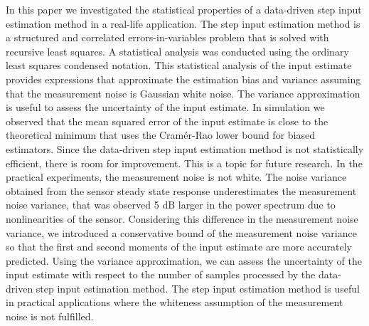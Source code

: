 In this paper we investigated the statistical properties of a data-driven step input estimation method in a real-life application.
The step input estimation method is a structured and correlated errors-in-variables problem that is solved with recursive least squares.
A statistical analysis was conducted using the ordinary least squares condensed notation. 
This statistical analysis of the input estimate provides expressions that approximate the estimation bias and variance assuming that the measurement noise is Gaussian white noise. 
The variance approximation is useful to assess the uncertainty of the input estimate.
In simulation we observed that the mean squared error of the input estimate is close to the theoretical minimum that uses the Cram\'er-Rao lower bound for biased estimators.
Since the data-driven step input estimation method is not statistically efficient, there is room for improvement. This is a topic for future research.
In the practical experiments, the measurement noise is not white.
The noise variance obtained from the sensor steady state response underestimates the measurement noise variance, that was observed 5 dB larger in the power spectrum due to nonlinearities of the sensor.
Considering this difference in the measurement noise variance, we introduced a conservative bound of the measurement noise variance so that the first and second moments of the input estimate are more accurately predicted.
Using the variance approximation, we can assess the uncertainty of the input estimate with respect to the number of samples processed by the data-driven step input estimation method.
The step input estimation method is useful in practical applications where the whiteness assumption of the measurement noise is not fulfilled. 


\newpage

